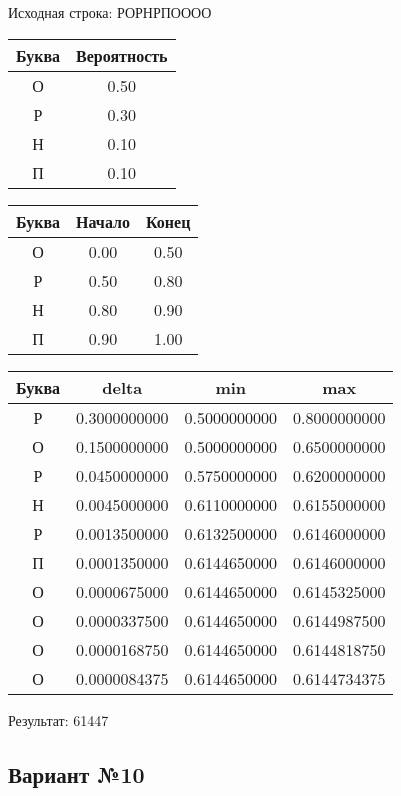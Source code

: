 \documentclass[a4paper, 12pt]{article}
\begin{document}
Исходная строка: РОРНРПОООО\
\begin{center}
 \begin{tabular}{ |c|c| } 
  \hline
     Буква & Вероятность \\ \hline
О & 0.50\\\hline
Р & 0.30\\\hline
Н & 0.10\\\hline
П & 0.10
\\ \hline \end{tabular}
\end{center}
\begin{center}
 \begin{tabular}{ |c|c|c| } 
  \hline
     Буква & Начало & Конец \\ \hline
О & 0.00 & 0.50\\\hline
Р & 0.50 & 0.80\\\hline
Н & 0.80 & 0.90\\\hline
П & 0.90 & 1.00
\\ \hline \end{tabular}
\end{center}
\begin{center}
 \begin{tabular}{ |c|c|c|c| } 
  \hline
     Буква & delta & min & max \\ \hline
Р & 0.3000000000 & 0.5000000000 & 0.8000000000\\\hline
О & 0.1500000000 & 0.5000000000 & 0.6500000000\\\hline
Р & 0.0450000000 & 0.5750000000 & 0.6200000000\\\hline
Н & 0.0045000000 & 0.6110000000 & 0.6155000000\\\hline
Р & 0.0013500000 & 0.6132500000 & 0.6146000000\\\hline
П & 0.0001350000 & 0.6144650000 & 0.6146000000\\\hline
О & 0.0000675000 & 0.6144650000 & 0.6145325000\\\hline
О & 0.0000337500 & 0.6144650000 & 0.6144987500\\\hline
О & 0.0000168750 & 0.6144650000 & 0.6144818750\\\hline
О & 0.0000084375 & 0.6144650000 & 0.6144734375
\\ \hline \end{tabular}
\end{center}
Результат: 61447
\pagebreak
\subsection{Вариант №10}
\end{document}
